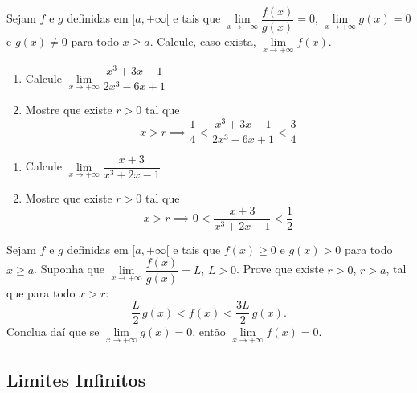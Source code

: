 \begin{exercicio}[2]
Sejam $f$ e $g$ definidas em $[a, +\infty[$ e tais que $\lim\limits_{x \to +\infty} \dfrac{f(x)}{g(x)} = 0$, $\lim\limits_{x \to +\infty} g(x) = 0$ e $g(x) \neq 0$ para todo $x \ge a$. Calcule, caso exista, $\lim\limits_{x \to +\infty} f(x)$.
\end{exercicio}

\begin{exercicio}[3]
\begin{enumerate}[label=\alph*)]
    \item Calcule $\lim\limits_{x \to +\infty} \dfrac{x^3 + 3x - 1}{2x^3 - 6x + 1}$
    \item Mostre que existe $r > 0$ tal que
    \[
    x > r \implies \dfrac{1}{4} < \dfrac{x^3 + 3x - 1}{2x^3 - 6x + 1} < \dfrac{3}{4}
    \]
\end{enumerate}
\end{exercicio}

\begin{exercicio}[4]
\begin{enumerate}[label=\alph*)]
    \item Calcule $\lim\limits_{x \to +\infty} \dfrac{x + 3}{x^3 + 2x - 1}$
    \item Mostre que existe $r > 0$ tal que
    \[
    x > r \implies 0 < \dfrac{x + 3}{x^3 + 2x - 1} < \dfrac{1}{2}
    \]
\end{enumerate}
\end{exercicio}

\begin{exercicio}[5]
Sejam $f$ e $g$ definidas em $[a, +\infty[$ e tais que $f(x) \ge 0$ e $g(x) > 0$ para todo $x \ge a$. Suponha que $\lim\limits_{x \to +\infty} \dfrac{f(x)}{g(x)} = L$, $L > 0$. Prove que existe $r > 0$, $r > a$, tal que para todo $x > r$:
\[
\dfrac{L}{2}\,g(x) < f(x) < \dfrac{3L}{2}\,g(x).
\]
Conclua daí que se $\lim\limits_{x \to +\infty} g(x) = 0$, então $\lim\limits_{x \to +\infty} f(x) = 0$.
\end{exercicio}

\clearpage

\subsection{Limites Infinitos}

